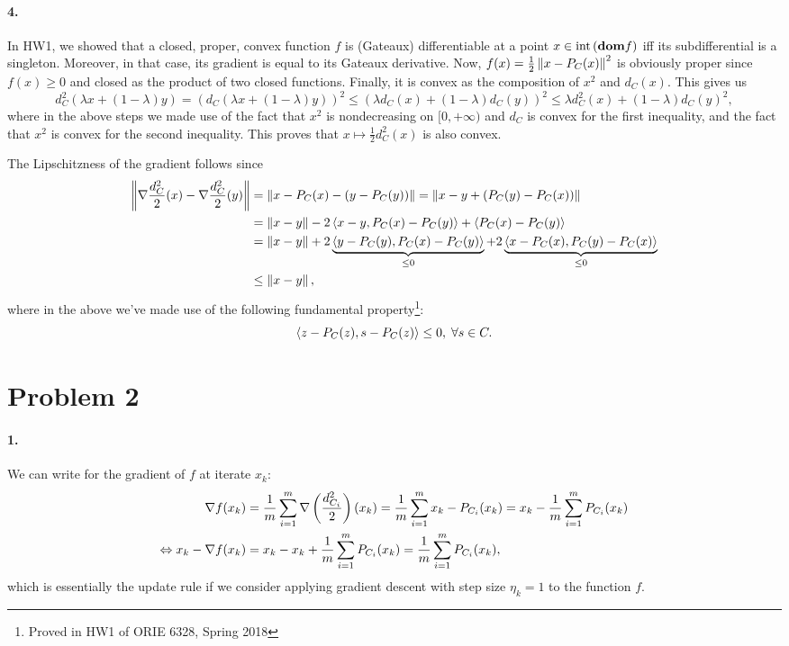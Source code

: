 \documentclass[10pt]{article}
\begin{document}
\paragraph{4.}
In HW1, we showed that a closed, proper, convex function $f$ is (Gateaux) 
differentiable at a point $x \in \mathrm{int}\left( \textbf{dom} f \right)$ iff its 
subdifferential is a singleton. Moreover, in that case, its gradient is equal
to its Gateaux derivative. Now, $f(x) = \frac{1}{2} \left \| x - P_C(x) \right \|^2$ is
obviously proper since $f(x) \geq 0$ and closed as the product of two closed
functions. Finally, it is convex as the composition of $x^2$ and $d_C(x)$. 
This gives us
\[
    d^2_C(\lambda x + (1 - \lambda) y) =
    \left( d_C(\lambda x + (1 - \lambda) y) \right)^2 \leq
    \left( \lambda d_C(x) + (1 - \lambda) d_C(y) \right)^2 \leq
    \lambda d_C^2(x) + (1 - \lambda) d_C(y)^2,
\]
where in the above steps we made use of the fact that $x^2$ is nondecreasing on
$[0, +\infty)$ and $d_C$ is convex for the first inequality, and the fact that
$x^2$ is convex for the second inequality. This proves that $x \mapsto 
\frac{1}{2}d_C^2(x)$ is also convex.

The Lipschitzness of the gradient follows since
\begin{align*}
    \left \| \nabla \frac{d_C^2}{2}(x) - \nabla \frac{d_C^2}{2}(y) \right \| &=
    \left \| x - P_C(x) - (y - P_C(y)) \right \| = \left \| x - y + (P_C(y) - P_C(x)) \right \| \\
    &= \left \| x - y \right \| - 2\left\langle x - y, P_C(x) - P_C(y) \right\rangle + \left\langle P_C(x) - P_C(y) \right\rangle \\
    &= \left \| x - y \right \| + 2 \underbrace{\left\langle y - P_C(y), P_C(x) - P_C(y) \right\rangle}_{\leq 0}
       + 2 \underbrace{\left\langle x - P_C(x), P_C(y) - P_C(x) \right\rangle}_{\leq 0} \\
    &\leq \left \| x - y \right \|,
\end{align*}
where in the above we've made use of the following fundamental 
property\footnote{Proved in HW1 of ORIE 6328, Spring 2018}:
\[
    \left\langle z - P_C(z), s - P_C(z) \right\rangle \leq 0, \; \forall s \in C.
\]
\section*{Problem 2}
\paragraph{1.}
We can write for the gradient of $f$ at iterate $x_k$:
\begin{align*}
    \nabla f(x_k) &= \frac{1}{m} \sum_{i=1}^{m} \nabla \left(
    \frac{d^2_{C_i}}{2} \right)(x_k) = \frac{1}{m} \sum_{i=1}^m x_k -
    P_{C_i}(x_k) = x_k - \frac{1}{m} \sum_{i=1}^m P_{C_i}(x_k) \\
    \Leftrightarrow
    x_k - \nabla f(x_k) &= x_k - x_k + \frac{1}{m} \sum_{i=1}^m P_{C_i}(x_k)
        = \frac{1}{m} \sum_{i=1}^m P_{C_i}(x_k),
\end{align*}
which is essentially the update rule if we consider applying gradient descent
with step size $\eta_k = 1$ to the function $f$.
\end{document}
